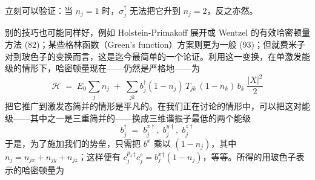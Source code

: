 立刻可以验证：当 $n_j = 1$ 时，$\sigma_j^{\dagger}$ 无法把它升到 $n_j = 2$，反之亦然。

别的技巧也可能同样好，例如 Holstein-Primakoff 展开或 Wentzel 的有效哈密顿量方法 (82)；某些格林函数（Green's function）方案则更为一般 (93)；但就费米子对到玻色子的变换而言，这是迄今最简单的一个论证。利用这一变换，在单激发能级的情形下，哈密顿量现在——仍然是严格地——为
\begin{equation*}
\mathcal{H} \;=\; E_0 \sum_j n_j \;+\; \sum_{jk} b_j^{\dagger}(1-n_j)\, T_{jk}\, (1-n_k)\, b_k\; \frac{|X|^2}{2}
\end{equation*}
把它推广到激发态简并的情形是平凡的。在我们正在讨论的情形中，可以把这对能级——其中之一是三重简并的——换成三维谐振子最低的两个能级
\begin{equation*}
b_j^{\dagger} \;=\; b_j^{x\dagger},\; b_j^{y\dagger},\; b_j^{z\dagger}
\end{equation*}
于是，为了施加我们的势垒，只需把 $b^x$ 乘以 $(1-n_j)$，其中 $n_j = n_{jx} + n_{jy} + n_{jz}$；这样便有 $c_j^{p_x}{}^{\dagger} c_j^{s} = b_j^{x}{}^{\dagger}(1-n_j)$，等等。所得的用玻色子表示的哈密顿量为

